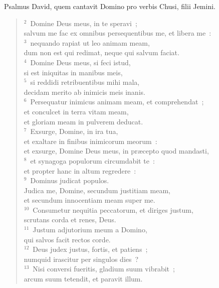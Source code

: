 \bchapter
\lettrine[lines=3,image=true,loversize=0.05,lraise=-0.03]{P}{}salmus David, quem cantavit Domino pro verbis Chusi, filii Jemini.
\begin{flushleft}\begin{verse}\vspace{6pt}${}^{2}$~Domine Deus meus, in te speravi~;\\ salvum me fac ex omnibus persequentibus me, et libera me~:\\
${}^{3}$~nequando rapiat ut leo animam meam,\\ dum non est qui redimat, neque qui salvum faciat.\\
${}^{4}$~Domine Deus meus, si feci istud,\\ si est iniquitas in manibus meis,\\
${}^{5}$~si reddidi retribuentibus mihi mala,\\ decidam merito ab inimicis meis inanis.\\
${}^{6}$~Persequatur inimicus animam meam, et comprehendat~;\\ et conculcet in terra vitam meam,\\ et gloriam meam in pulverem deducat.\\
${}^{7}$~Exsurge, Domine, in ira tua,\\ et exaltare in finibus inimicorum meorum~:\\ et exsurge, Domine Deus meus, in pr\ae cepto quod mandasti,\\
${}^{8}$~et synagoga populorum circumdabit te~:\\ et propter hanc in altum regredere~:\\
${}^{9}$~Dominus judicat populos.\\ Judica me, Domine, secundum justitiam meam,\\ et secundum innocentiam meam super me.\\
${}^{10}$~Consumetur nequitia peccatorum, et diriges justum,\\ scrutans corda et renes, Deus.\\
${}^{11}$~Justum adjutorium meum a Domino,\\ qui salvos facit rectos corde.\\
${}^{12}$~Deus judex justus, fortis, et patiens~;\\ numquid irascitur per singulos dies~?\\
${}^{13}$~Nisi conversi fueritis, gladium suum vibrabit~;\\ arcum suum tetendit, et paravit illum.\\

\end{verse}
\end{flushleft}
